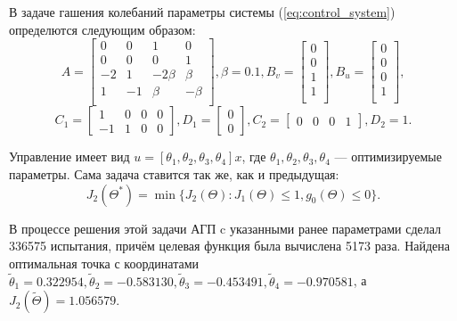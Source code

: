 В задаче гашения колебаний параметры системы (\ref{eq:control_system}) определются следующим
образом:
$$
A=\begin{bmatrix}
  0  & 0 & 1 & 0 \\
  0  & 0 & 0 & 1 \\
  -2  & 1 & -2\beta & \beta \\
  1  & -1 & \beta & -\beta \\
\end{bmatrix}, \beta = 0.1,
B_v=\begin{bmatrix}
0       \\
0       \\
1       \\
1       \\
\end{bmatrix},
B_u=\begin{bmatrix}
0       \\
0       \\
0       \\
1       \\
\end{bmatrix},
$$
$$
C_1=\begin{bmatrix}
1 & 0 & 0 & 0 \\
-1 & 1 & 0 & 0
\end{bmatrix},
D_1=\begin{bmatrix}
0 \\
0
\end{bmatrix},
C_2=\begin{bmatrix}
0 & 0 & 0  & 1
\end{bmatrix},D_2=1.
$$

Управление имеет вид \(u=[\theta_1,\theta_2, \theta_3,\theta_4]x\), где \(\theta_1,\theta_2, \theta_3,\theta_4\) ---
оптимизируемые параметры. Сама задача ставится так же, как и предыдущая:
\begin{displaymath}
   J_2(\Theta^*)=\min\{J_2(\Theta):J_1(\Theta)\leqslant 1, g_0(\Theta)\leqslant 0\}.
\end{displaymath}

В процессе решения этой задачи АГП c указанными ранее параметрами сделал 336575 испытания, причём целевая функция
была вычислена 5173 раза. Найдена оптимальная точка с координатами
\(\widetilde\theta_1 =0.322954,\widetilde\theta_2=-0.583130, \widetilde\theta_3=-0.453491, \widetilde\theta_4=-0.970581\),
а \(J_2(\widetilde\Theta)=1.056579\).
